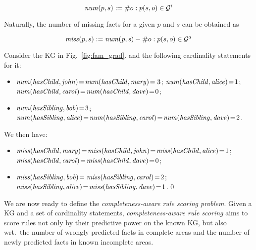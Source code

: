 \begin{equation}\label{eq:num}
\mathit{num}(p,s) := \# o : p(s,o) \in \mathcal{G}^i 
\end{equation}

Naturally, the number of missing facts for a given $p$ and $s$ can be obtained as

\begin{equation}\label{eq:miss}
\mi{miss}(p,s) := \mi{num(p,s)} - \#o : p(s,o) \in \cG^a %
\end{equation}

\begin{example}
\label{ex:cardinality}
Consider the KG in Fig.~\ref{fig:fam_grad}.
and the following cardinality statements for it: %
\vspace{-\topsep}
\begin{itemize}
\setlength{\parskip}{0pt}
\setlength{\itemsep}{0pt plus 1pt}
\item $\mathit{num(hasChild,john)}\!=\!\mathit{num(hasChild,mary)}\!=3$; $\mathit{num(hasChild,alice)}\!=\!1$;\\  $\mathit{num(hasChild,carol)}\!=\!\mathit{num(hasChild,dave)}\!=\!0$;
\item $\mathit{num(hasSibling,bob)}\!=\!3$;
      $\mathit{num(hasSibling,alice)}\!=\!\mathit{num(hasSibling,carol)}\!=\!\mathit{num(hasSibling,dave)}\!=\!2$.
\end{itemize}
\vspace{-\topsep}
We then have:
\vspace{-\topsep}
\begin{itemize}
\setlength{\parskip}{0pt}
\setlength{\itemsep}{0pt plus 1pt}
\item $\mathit{miss(hasChild,mary)}\!=\!\mathit{miss(hasChild,john)}\!=\!\mathit{miss(hasChild,alice)}\!=\!1$;\\
      $\mathit{miss(hasChild,carol)}\!=\!\mathit{miss(hasChild,dave)}\!=\!0$; 
\item $\mathit{miss(hasSibling,bob)}\!=\mathit{miss(hasSibling,carol)}\!=\!2$;\\ 
      $\mathit{miss(hasSibling,alice)}\!=\!\mathit{miss(hasSibling,dave)}\!=\!1$.\qed
\end{itemize}
\end{example}


We are now ready to 
define the \emph{completeness-aware rule scoring problem}.
Given a KG and a set of 
cardinality statements, \emph{completeness-aware rule scoring} aims to score rules not only by their predictive power on the known KG, but also wrt.\ the number of wrongly predicted facts  
in complete areas and the number of newly predicted 
facts in known incomplete areas.

